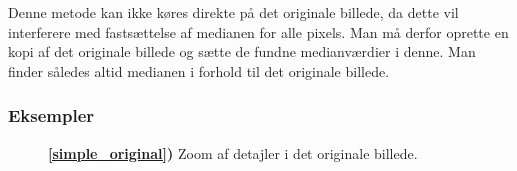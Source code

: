 {Denne metode kan ikke køres direkte på det originale billede, da dette
vil interferere med fastsættelse af medianen for alle pixels. Man må
derfor oprette en kopi af det originale billede og sætte de fundne
medianværdier i denne. Man finder således altid medianen i forhold til det
originale billede.

\subsubsection*{Eksempler}

\begin{figure}[!h]
    \centering
    \hspace{1em}
    \hspace{1em}
    \caption[]{
        \textbf{\ref{simple_original})} Zoom af detajler i det originale billede.
}
\end{figure}}
